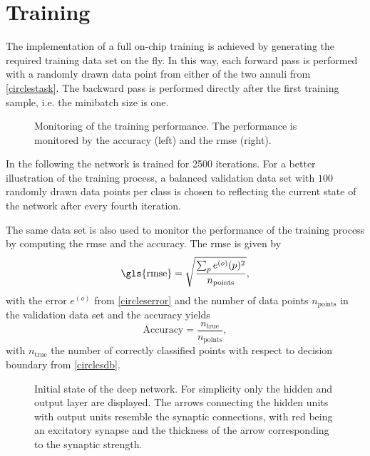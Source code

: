 \section{Training}
The implementation of a full on-chip training is achieved by generating the required training data set on the fly. In this way, each forward pass is performed with a randomly drawn data point from either of the two annuli from \cref{circlestask}. The backward pass is performed directly after the first training sample, i.e. the minibatch size is one.

\begin{figure}
	\begin{center}
		
	\end{center}
	\caption[Monitoring of the training performance.]{Monitoring of the training performance. The performance is monitored by the accuracy (left) and the \acrfull{rmse} (right).}
	\label{circles_acc}
\end{figure}

In the following the network is trained for 2500 iterations. For a better illustration of the training process, a balanced validation data set with $100$ randomly drawn data points per class is chosen to reflecting the current state of the network after every fourth iteration. 

The same data set is also used to monitor the performance of the training process by computing the \gls{rmse} and the accuracy. The \gls{rmse} is given by
\begin{equation}
\text{\gls{rmse}} = \sqrt{\frac{\sum_p e^{(o)}(p)^2}{n_\text{points}}},
\end{equation}
with the error $e^{(o)}$ from \cref{circleserror} and the number of data points $n_\text{points}$ in the validation data set and the accuracy yields
\begin{equation}
\text{Accuracy} = \frac{n_\text{true}}{n_\text{points}},
\end{equation}
with $n_\text{true}$ the number of correctly classified points with respect to decision boundary from \cref{circlesdb}.

\begin{figure}
	
	\caption[Initial state of the deep network.]{Initial state of the deep network. For simplicity only the hidden and output layer are displayed. The arrows connecting the hidden units with output units resemble the synaptic connections, with red being an excitatory synapse and the thickness of the arrow corresponding to the synaptic strength.}
	\label{learning_process_s5}
\end{figure}

